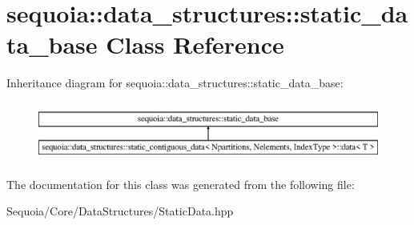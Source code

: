 \hypertarget{classsequoia_1_1data__structures_1_1static__data__base}{}\section{sequoia\+::data\+\_\+structures\+::static\+\_\+data\+\_\+base Class Reference}
\label{classsequoia_1_1data__structures_1_1static__data__base}
Inheritance diagram for sequoia\+::data\+\_\+structures\+::static\+\_\+data\+\_\+base\+:\begin{figure}[H]
\begin{center}
\leavevmode
\includegraphics[height=1.968366cm]{classsequoia_1_1data__structures_1_1static__data__base}
\end{center}
\end{figure}


The documentation for this class was generated from the following file\+:\begin{DoxyCompactItemize}
\item 
Sequoia/\+Core/\+Data\+Structures/Static\+Data.\+hpp\end{DoxyCompactItemize}
